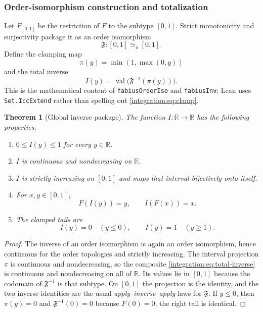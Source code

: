 \documentclass[11pt,oneside]{article}
\newtheorem{theorem}{Theorem}[section]
\theoremstyle{definition}
\theoremstyle{remark}
\newcommand{\R}{\mathbb R}
\begin{document}
\subsubsection{Order-isomorphism construction and totalization}

Let $F_{[0,1]}$ be the restriction of $F$ to the subtype $[0,1]$.  Strict monotonicity and
surjectivity package it as an order isomorphism
\begin{equation}
 \mathfrak F:[0,1]\simeq_o[0,1].
 \label{integration:eq:fabius-order-iso}
\end{equation}
Define the clamping map
\begin{equation}
 \pi(y)=\min(1,\max(0,y))
 \label{integration:eq:clamp}
\end{equation}
and the total inverse
\begin{equation}
 I(y)=\operatorname{val}\bigl(\mathfrak F^{-1}(\pi(y))\bigr).
 \label{integration:eq:total-inverse}
\end{equation}
This is the mathematical content of \nolinkurl{fabiusOrderIso} and
\nolinkurl{fabiusInv}; Lean uses \nolinkurl{Set.IccExtend} rather than spelling
out \eqref{integration:eq:clamp}.

\begin{theorem}[Global inverse package]
\label{integration:thm:global-inverse}
The function $I:\R\to\R$ has the following properties.
\begin{enumerate}
 \item $0\le I(y)\le1$ for every $y\in\R$.
 \item $I$ is continuous and nondecreasing on $\R$.
 \item $I$ is strictly increasing on $[0,1]$ and maps that interval bijectively onto itself.
 \item For $x,y\in[0,1]$,
 \begin{equation}
  F(I(y))=y,
  \qquad
  I(F(x))=x.
  \label{integration:eq:two-sided-inverse}
 \end{equation}
 \item The clamped tails are
 \begin{equation}
  I(y)=0\quad(y\le0),
  \qquad
  I(y)=1\quad(y\ge1).
  \label{integration:eq:inverse-tails}
 \end{equation}
\end{enumerate}
\end{theorem}

\begin{proof}
The inverse of an order isomorphism is again an order isomorphism, hence continuous for the
order topologies and strictly increasing.  The interval projection $\pi$ is continuous and
nondecreasing, so the composite \eqref{integration:eq:total-inverse} is continuous and nondecreasing on
all of $\R$.  Its values lie in $[0,1]$ because the codomain of $\mathfrak F^{-1}$ is that
subtype.  On $[0,1]$ the projection is the identity, and the two inverse identities are the
usual \emph{apply--inverse--apply} laws for $\mathfrak F$.  If $y\le0$, then $\pi(y)=0$ and
$\mathfrak F^{-1}(0)=0$ because $F(0)=0$; the right tail is identical.
\end{proof}
\end{document}
